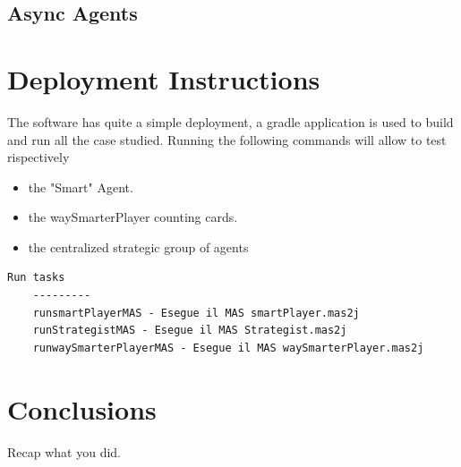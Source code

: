 \section{Async Agents}




\chapter{Deployment Instructions}

The software has quite a simple deployment, a gradle application is used to build and run all the case studied. Running the following commands will allow to test rispectively
\begin{itemize}
    \item the "Smart" Agent.
    \item the waySmarterPlayer counting cards.
    \item the centralized strategic group of agents
\end{itemize}



\begin{lstlisting}[style=gradlestyle, caption=Runnable tasks, label=lst:bash_tasks]
    Run tasks
    ---------
    runsmartPlayerMAS - Esegue il MAS smartPlayer.mas2j
    runStrategistMAS - Esegue il MAS Strategist.mas2j
    runwaySmarterPlayerMAS - Esegue il MAS waySmarterPlayer.mas2j
\end{lstlisting}

\chapter{Conclusions}
Recap what you did.